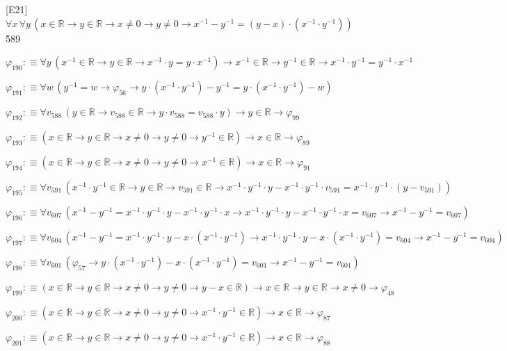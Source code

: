 \begin{fullproof}{[E21]}{$\forall x\,\forall y\,(x \in \mathbb{R} \to y \in \mathbb{R} \to x \neq 0 \to y \neq 0 \to x^{-1} - y^{-1} = (y - x) \cdot (x^{-1} \cdot y^{-1}))$}{589}
\begin{abbrevlist}
\item $\varphi_{190} :\equiv \forall y\,(x^{-1} \in \mathbb{R} \to y \in \mathbb{R} \to x^{-1} \cdot y = y \cdot x^{-1}) \to x^{-1} \in \mathbb{R} \to y^{-1} \in \mathbb{R} \to x^{-1} \cdot y^{-1} = y^{-1} \cdot x^{-1}$
\item $\varphi_{191} :\equiv \forall w\,(y^{-1} = w \to \varphi_{56} \to y \cdot (x^{-1} \cdot y^{-1}) - y^{-1} = y \cdot (x^{-1} \cdot y^{-1}) - w)$
\item $\varphi_{192} :\equiv \forall v_{588}\,(y \in \mathbb{R} \to v_{588} \in \mathbb{R} \to y \cdot v_{588} = v_{588} \cdot y) \to y \in \mathbb{R} \to \varphi_{99}$
\item $\varphi_{193} :\equiv (x \in \mathbb{R} \to y \in \mathbb{R} \to x \neq 0 \to y \neq 0 \to y^{-1} \in \mathbb{R}) \to x \in \mathbb{R} \to \varphi_{89}$
\item $\varphi_{194} :\equiv (x \in \mathbb{R} \to y \in \mathbb{R} \to x \neq 0 \to y \neq 0 \to x^{-1} \in \mathbb{R}) \to x \in \mathbb{R} \to \varphi_{91}$
\item $\varphi_{195} :\equiv \forall v_{591}\,(x^{-1} \cdot y^{-1} \in \mathbb{R} \to y \in \mathbb{R} \to v_{591} \in \mathbb{R} \to x^{-1} \cdot y^{-1} \cdot y - x^{-1} \cdot y^{-1} \cdot v_{591} = x^{-1} \cdot y^{-1} \cdot (y - v_{591}))$
\item $\varphi_{196} :\equiv \forall v_{607}\,(x^{-1} - y^{-1} = x^{-1} \cdot y^{-1} \cdot y - x^{-1} \cdot y^{-1} \cdot x \to x^{-1} \cdot y^{-1} \cdot y - x^{-1} \cdot y^{-1} \cdot x = v_{607} \to x^{-1} - y^{-1} = v_{607})$
\item $\varphi_{197} :\equiv \forall v_{604}\,(x^{-1} - y^{-1} = x^{-1} \cdot y^{-1} \cdot y - x \cdot (x^{-1} \cdot y^{-1}) \to x^{-1} \cdot y^{-1} \cdot y - x \cdot (x^{-1} \cdot y^{-1}) = v_{604} \to x^{-1} - y^{-1} = v_{604})$
\item $\varphi_{198} :\equiv \forall v_{601}\,(\varphi_{57} \to y \cdot (x^{-1} \cdot y^{-1}) - x \cdot (x^{-1} \cdot y^{-1}) = v_{601} \to x^{-1} - y^{-1} = v_{601})$
\item $\varphi_{199} :\equiv (x \in \mathbb{R} \to y \in \mathbb{R} \to x \neq 0 \to y \neq 0 \to y - x \in \mathbb{R}) \to x \in \mathbb{R} \to y \in \mathbb{R} \to x \neq 0 \to \varphi_{48}$
\item $\varphi_{200} :\equiv (x \in \mathbb{R} \to y \in \mathbb{R} \to x \neq 0 \to y \neq 0 \to x^{-1} \cdot y^{-1} \in \mathbb{R}) \to x \in \mathbb{R} \to \varphi_{87}$
\item $\varphi_{201} :\equiv (x \in \mathbb{R} \to y \in \mathbb{R} \to x \neq 0 \to y \neq 0 \to x^{-1} \cdot y^{-1} \in \mathbb{R}) \to x \in \mathbb{R} \to \varphi_{88}$

\end{abbrevlist}
\end{fullproof}
